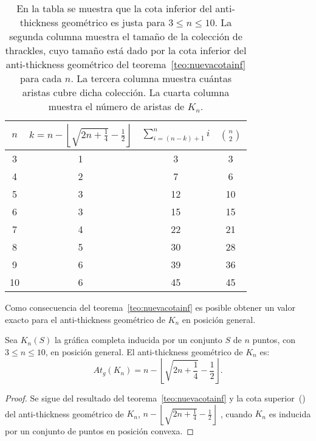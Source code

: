     \begin{table}[t]
      \centering
      \begin{tabular}{|c|c|c|c|}
        \hline
        $n$ & $k=n - \left\lfloor\sqrt{2n+\frac{1}{4}} - \frac{1}{2}\right\rfloor$ & $\sum^n_{i=(n-k) + 1}i$ & $\binom{n}{2}$\\[5pt] \hline\hline
        3   & 1  & 3 & 3 \\ \hline
        4   & 2  & 7 & 6 \\ \hline
        5   & 3  & 12 & 10 \\ \hline
        6   & 3  & 15 & 15 \\ \hline
        7   & 4  & 22 & 21 \\ \hline
        8   & 5  & 30 & 28 \\ \hline
        9   & 6  & 39 & 36 \\ \hline
        10  & 6  & 45 & 45 \\ \hline
      \end{tabular}
      \caption{En la tabla se muestra que la cota inferior del anti-thickness
      geométrico es justa para $3 \leq n \leq 10$. La segunda columna muestra el
      tamaño de la colección de thrackles, cuyo tamaño está dado por la cota
      inferior del anti-thickness geométrico del teorema~\ref{teo:nuevacotainf}
      para cada $n$. La tercera columna muestra cuántas aristas cubre dicha
      colección. La cuarta columna muestra el número de aristas de $K_n$.}
      \label{table:atnuevacota}
    \end{table}

    Como consecuencia del teorema~\ref{teo:nuevacotainf} es posible obtener un valor exacto para el anti-thickness geométrico de $K_n$ en posición general.
    \begin{theorem}\label{teo:cotaexacta}
      Sea $K_n(S)$ la gráfica completa inducida por un conjunto $S$ de $n$ puntos, con $3 \leq n \leq 10$, en posición general. El anti-thickness geométrico de $K_n$ es:
      \[ At_g(K_n) = n - \left\lfloor\sqrt{2n + \frac{1}{4}} - \frac{1}{2}\right\rfloor. \]
    \end{theorem}
    \begin{proof}
      Se sigue del resultado del teorema~\ref{teo:nuevacotainf} y
      la cota superior~(\cite{Fabila-Monroy2018}) del anti-thickness geométrico de $K_n$,
      $n - \left\lfloor\sqrt{2n + \frac{1}{4}} - \frac{1}{2}\right\rfloor $ , cuando
      $K_n$ es inducida por un conjunto de puntos en posición convexa.
    \end{proof}

